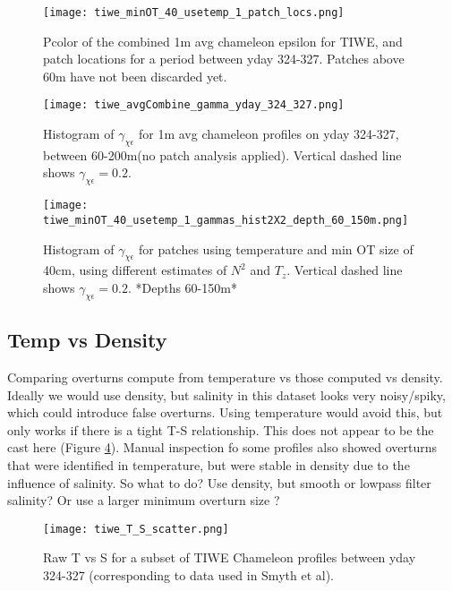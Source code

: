 \documentclass[11pt]{article}
\begin{document}
\begin{figure}[htbp]
\texttt{[image: tiwe\_minOT\_40\_usetemp\_1\_patch\_locs.png]}
\caption{Pcolor of the combined 1m avg chameleon epsilon for TIWE, and patch locations for a period between yday 324-327. Patches above 60m have not been discarded yet.}
\label{patchlocs}
\end{figure}



\begin{figure}[htbp]
\texttt{[image: tiwe\_avgCombine\_gamma\_yday\_324\_327.png]}
\caption{Histogram of $\gamma_{\chi\epsilon}$ for 1m avg chameleon profiles on yday 324-327, between 60-200m(no patch analysis applied). Vertical dashed line shows $\gamma_{\chi\epsilon}=0.2$.}
\label{avggam}
\end{figure}


\begin{figure}[htbp]
\texttt{[image: tiwe\_minOT\_40\_usetemp\_1\_gammas\_hist2X2\_depth\_60\_150m.png]}
\caption{Histogram of $\gamma_{\chi\epsilon}$ for patches using temperature and min OT size of 40cm, using different estimates of $N^2$ and $T_z$. Vertical dashed line shows $\gamma_{\chi\epsilon}=0.2$. *Depths 60-150m*}
\label{patchgam}
\end{figure}



\clearpage
\subsection{Temp vs Density}

Comparing overturns compute from temperature vs those computed vs density. Ideally we would use density, but salinity in this dataset looks very noisy/spiky, which could introduce false overturns. Using temperature would avoid this, but only works if there is a tight T-S relationship. This does not appear to be the cast here (Figure \ref{TSplot}). Manual inspection fo some profiles also showed overturns that were identified in temperature, but were stable in density due to the influence of salinity. So what to do? Use density, but smooth or lowpass filter salinity? Or use a larger minimum overturn size ?

\begin{figure}[htbp]
\texttt{[image: tiwe\_T\_S\_scatter.png]}
\caption{ Raw T vs S for a subset of TIWE Chameleon profiles between yday 324-327 (corresponding to data used in Smyth et al).}
\label{TSplot}
\end{figure}
\end{document}
